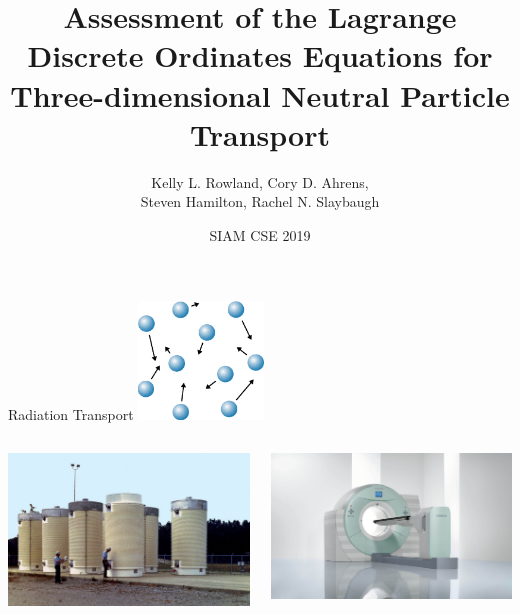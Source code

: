 \documentclass{beamer}
\title[Assessment of the LDO Equations for 3D Neutral Particle Transport]
{Assessment of the Lagrange Discrete Ordinates Equations for Three-dimensional Neutral Particle Transport}
\author[Kelly L. Rowland et al.]{Kelly L. Rowland, Cory D. Ahrens, \\Steven Hamilton, Rachel N. Slaybaugh}
\date{SIAM CSE 2019}
\begin{document}
\begin{frame}[plain]
	\titlepage
\end{frame}

\begin{frame}{Radiation Transport}
%
\pause
%
\center
\includegraphics[width=0.25\textwidth,natwidth=212,natheight=200]{img/particles.png}
%
\pause
%
\begin{columns}
\begin{column}{0.5\textwidth}
\center
\includegraphics[width=\textwidth,natwidth=1024,natheight=648]{img/nuclear_dry_storage.jpg}
\end{column}
\begin{column}{0.5\textwidth}
\center
\includegraphics[width=\textwidth,natwidth=2369,natheight=1433]{img/pet-spect.jpg}
\end{column}
\end{columns}
%
\end{frame}
\end{document}
